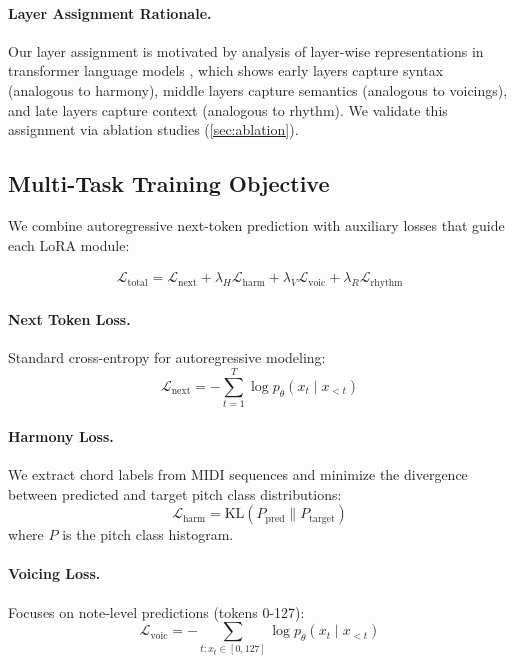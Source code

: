 \documentclass{article}
\begin{document}
\paragraph{Layer Assignment Rationale.}
Our layer assignment is motivated by analysis of layer-wise representations in transformer language models \cite{tenney2019bert}, which shows early layers capture syntax (analogous to harmony), middle layers capture semantics (analogous to voicings), and late layers capture context (analogous to rhythm). We validate this assignment via ablation studies (\cref{sec:ablation}).

\subsection{Multi-Task Training Objective}

We combine autoregressive next-token prediction with auxiliary losses that guide each LoRA module:

\begin{align}
    \mathcal{L}_{\text{total}} = \mathcal{L}_{\text{next}} + \lambda_H \mathcal{L}_{\text{harm}} + \lambda_V \mathcal{L}_{\text{voic}} + \lambda_R \mathcal{L}_{\text{rhythm}}
\end{align}

\paragraph{Next Token Loss.}
Standard cross-entropy for autoregressive modeling:
\begin{equation}
    \mathcal{L}_{\text{next}} = -\sum_{t=1}^T \log p_\theta(x_t \mid x_{<t})
\end{equation}

\paragraph{Harmony Loss.}
We extract chord labels from MIDI sequences and minimize the divergence between predicted and target pitch class distributions:
\begin{equation}
    \mathcal{L}_{\text{harm}} = \text{KL}(P_{\text{pred}} \| P_{\text{target}})
\end{equation}
where $P$ is the pitch class histogram.

\paragraph{Voicing Loss.}
Focuses on note-level predictions (tokens 0-127):
\begin{equation}
    \mathcal{L}_{\text{voic}} = -\sum_{t: x_t \in [0,127]} \log p_\theta(x_t \mid x_{<t})
\end{equation}
\end{document}
